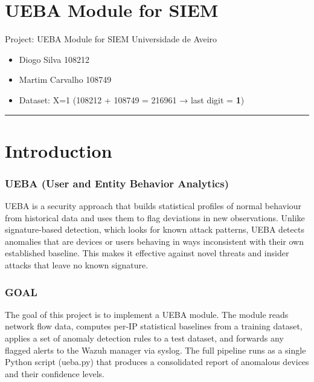 \documentclass[
  11pt,
]{article}
\author{}
\date{}
\providecommand{\tightlist}{%
  \setlength{\itemsep}{0pt}\setlength{\parskip}{0pt}}
\begin{document}
\hypertarget{ueba-module-for-siem}{%
\section{UEBA Module for SIEM}\label{ueba-module-for-siem}}

Project: UEBA Module for SIEM \textbar{} Universidade de Aveiro

\begin{itemize}
\tightlist
\item
  Diogo Silva 108212
\item
  Martim Carvalho 108749
\item
  Dataset: X=1 (108212 + 108749 = 216961 → last digit = \textbf{1})
\end{itemize}

\begin{center}\rule{0.5\linewidth}{0.5pt}\end{center}

\hypertarget{introduction}{%
\section{Introduction}\label{introduction}}

\hypertarget{ueba-user-and-entity-behavior-analytics}{%
\subsubsection{UEBA (User and Entity Behavior
Analytics)}\label{ueba-user-and-entity-behavior-analytics}}

UEBA is a security approach that builds statistical profiles of normal
behaviour from historical data and uses them to flag deviations in new
observations. Unlike signature-based detection, which looks for known
attack patterns, UEBA detects anomalies that are devices or users
behaving in ways inconsistent with their own established baseline. This
makes it effective against novel threats and insider attacks that leave
no known signature.

\hypertarget{goal}{%
\subsubsection{GOAL}\label{goal}}

The goal of this project is to implement a UEBA module. The module reads
network flow data, computes per-IP statistical baselines from a training
dataset, applies a set of anomaly detection rules to a test dataset, and
forwards any flagged alerts to the Wazuh manager via syslog. The full
pipeline runs as a single Python script (ueba.py) that produces a
consolidated report of anomalous devices and their confidence levels.
\end{document}
